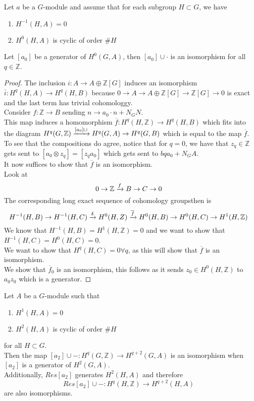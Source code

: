 \documentclass[../main.tex]{subfiles}
\begin{document}
\begin{thm}
	Let $a$ be a $G$-module and assume that for each subgroup $H \subset G$, we have
	\begin{enumerate}
	\item $H^{-1}( H,A) =0$ 
	\item $H^{0}( H,A) $ is cyclic of order $\# H$ 
	\end{enumerate}
	Let $[a_0] $ be a generator of $H^{0}(G,A)$, then $[a_0] \cup \cdot$ is an isomorphism for all $q\in \mathbb{Z}$.
\end{thm}
\begin{proof}
	The inclusion $i:A \to A\oplus \mathbb{Z}[G]$ induces an isomorphism $\overline{i}: H^{q}( H,A) \to H^{q}( H,B) $ because $0 \to A \to A \oplus \mathbb{Z}[G] \to \mathbb{Z}[G] \to 0$ is exact and the last term has trivial cohomologgy.\\
	Consider $f:\mathbb{Z}\to B$ sending $n \to a_0\cdot n+ N_G N$.\\
	This map induces a homomorphism $\overline{f}: H^{q}( H, \mathbb{Z}) \to H^{q}( H,B) $ which fits into the diagram $H^{q}( G, \mathbb{Z}) \xrightarrow{ [ a_0] \cup} H^{q}( G,A )\to H^{q}( G,B)  $ which is equal to the map $\overline{f}$.\\
	To see that the compositions do agree, notice that for $q=0$, we have that $z_q\in \mathbb{Z}$ gets sent to $ [ a_0\otimes z_q] = [ z_q a_0] $ which gets sent to $ bq a_0 + N_G A $.\\
	It now suffices to show that $\overline{f}$ is an isomorphism.\\
	Look at 
	\[ 
	0 \to \mathbb{Z}\xrightarrow{f} B \to C \to 0
	\]
	The corresponding long exact sequence of cohomology groupsthen is
	\[ 
		H^{-1}( H,B) \to H^{-1}( H,C) \xrightarrow{\delta} H^{0}( H,Z) \xrightarrow{ \overline{f}} H^{0}( H,B) \to H^{0}( H,C) \to H^{1}( H, \mathbb{Z}) 
	\]
We know that $H^{-1}( H,B) = H^{1}( H, \mathbb{Z}) =0$ and we want to show that $H^{-1}( H,C) = H^{0}( H,C) =0$.\\
We want to show that $H^{q}( H,C) =0\forall q $, as this will show that $\overline{f}$ is an isomorphism.\\
We show that $\overline{f}_0$ is an isomorphism, this follows as it sends $z_0 \in H^{0}( H, \mathbb{Z}) $ to $a_0 z_0$ which is a generator.
\end{proof}
\begin{thm}[of Tate]
	Let $A$ be a $G$-module such that
	\begin{enumerate}
	\item $H^{1}( H,A) =0$ 
	\item $H^{2}( H,A) $ is cyclic of order $\# H$	
	\end{enumerate}
	for all $H \subset G$.\\
	Then the map $[a_2] \cup -: H^{q}( G, \mathbb{Z}) \to H^{q+2}( G,A) $ is an isomorphism when $[a_2]$ is a generator of $H^{2}( G,A) $.\\
	Additionally, $Res [ a_2] $ generates $H^{2}( H,A) $  and therefore
	\[ 
	Res [ a_2] \cup - : H^{q}( H, \mathbb{Z}) \to H^{q+2}( H,A) 
	\]
	are also isomorphisms.
\end{thm}
\end{document}
